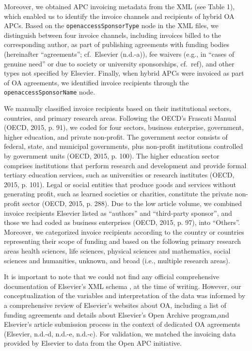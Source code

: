 \documentclass[a4paper,man,floatsintext,longtable,noextraspace,12pt]{apa6}
\begin{document}
Moreover, we obtained APC invoicing metadata from the XML (see Table 1),
which enabled us to identify the invoice channels and recipients of
hybrid OA APCs. Based on the \texttt{openaccessSponsorType} node in the
XML files, we distinguish between four invoice channels, including
invoices billed to the corresponding author, as part of publishing
agreements with funding bodies (hereinafter ``agreements''; cf.~Elsevier
(n.d.-a)), fee waivers (e.g., in ``cases of genuine need'' or due to
society or university sponsorships, cf.~ref), and other types not
specified by Elsevier. Finally, when hybrid APCs were invoiced as part
of OA agreements, we identified invoice recipients through the
\texttt{openaccessSponsorName} node.

We manually classified invoice recipients based on their institutional
sectors, countries, and primary research areas. Following the OECD's
Frascati Manual (OECD, 2015, p. 91), we coded for four sectors, business
enterprise, government, higher education, and private non-profit. The
government sector consists of federal, state, and municipal governments,
plus non-profit institutions controlled by government units (OECD, 2015,
p. 100). The higher education sector comprises institutions that perform
research and development and provide formal tertiary education services,
such as universities or research institutes (OECD, 2015, p. 101). Legal
or social entities that produce goods and services without generating
profit, such as learned societies or charities, constitute the private
non-profit sector (OECD, 2015, p. 288). Due to the low article volume,
we combined invoice recipients Elsevier listed as ``authors'' and
``third-party sponsor'', and those we had coded as business enterprises
(OECD, 2015, p. 97), into ``Others''. Moreover, we categorized invoice
recipients according to the country or countries representing their
scope of funding and based on the following primary research areas
health sciences, life sciences, physical sciences and mathematics,
social sciences and humanities, unknown, and broad (i.e., multiple
research areas).

It is important to note that we could not find any official
comprehensive documentation of Elsevier's XML schema , at the time of
writing. However, our conceptualization of the variables and
interpretation of the data was informed by a comprehensive review of
Elsevier's websites about OA, including a list of funding agreements and
details about Elsevier's Open Archive program,and Elsevier's article
submission process in the context of dedicated OA agreements (Elsevier,
n.d.-d, n.d.-e, n.d.-c). For validation, we matched the invoicing data
provided by Elsevier to data from the Open APC initiative.
\end{document}
